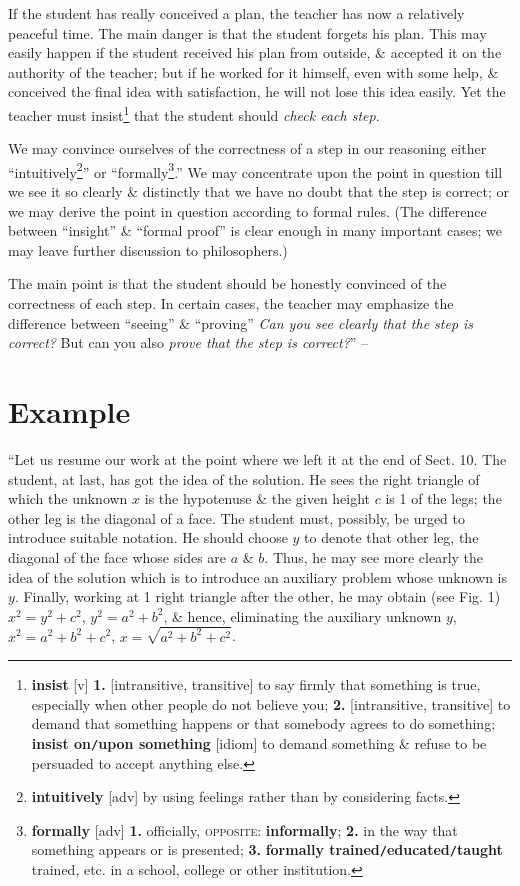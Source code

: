 \documentclass[oneside]{book}
\numberwithin{equation}{section}
\begin{document}
If the student has really conceived a plan, the teacher has now a relatively peaceful time. The main danger is that the student forgets his plan. This may easily happen if the student received his plan from outside, \& accepted it on the authority of the teacher; but if he worked for it himself, even with some help, \& conceived the final idea with satisfaction, he will not lose this idea easily. Yet the teacher must insist\footnote{\textbf{insist} [v] \textbf{1.} [intransitive, transitive] to say firmly that something is true, especially when other people do not believe you; \textbf{2.} [intransitive, transitive] to demand that something happens or that somebody agrees to do something; \textbf{insist on\texttt{/}upon something} [idiom] to demand something \& refuse to be persuaded to accept anything else.} that the student should \textit{check each step}.

We may convince ourselves of the correctness of a step in our reasoning either ``intuitively\footnote{\textbf{intuitively} [adv] by using feelings rather than by considering facts.}'' or ``formally\footnote{\textbf{formally} [adv] \textbf{1.} officially, \textsc{opposite}: \textbf{informally}; \textbf{2.} in the way that something appears or is presented; \textbf{3.} \textbf{formally trained\texttt{/}educated\texttt{/}taught} trained, etc. in a school, college or other institution.}.'' We may concentrate upon the point in question till we see it so clearly \& distinctly that we have no doubt that the step is correct; or we may derive the point in question according to formal rules. (The difference between ``insight'' \& ``formal proof'' is clear enough in many important cases; we may leave further discussion to philosophers.)

The main point is that the student should be honestly convinced of the correctness of each step. In certain cases, the teacher may emphasize the difference between ``seeing'' \& ``proving'' \textit{Can you see clearly that the step is correct?} But can you also \textit{prove that the step is correct?}'' -- \cite[pp. 12--13]{Polya2014}

\section{Example}
``Let us resume our work at the point where we left it at the end of Sect. 10. The student, at last, has got the idea of the solution. He sees the right triangle of which the unknown $x$ is the hypotenuse \& the given height $c$ is 1 of the legs; the other leg is the diagonal of a face. The student must, possibly, be urged to introduce suitable notation. He should choose $y$ to denote that other leg, the diagonal of the face whose sides are $a$ \& $b$. Thus, he may see more clearly the idea of the solution which is to introduce an auxiliary problem whose unknown is $y$. Finally, working at 1 right triangle after the other, he may obtain (see Fig. 1) $x^2 = y^2 + c^2$, $y^2 = a^2 + b^2$, \& hence, eliminating the auxiliary unknown $y$, $x^2 = a^2 + b^2 + c^2$, $x = \sqrt{a^2 + b^2 + c^2}$.
\end{document}
